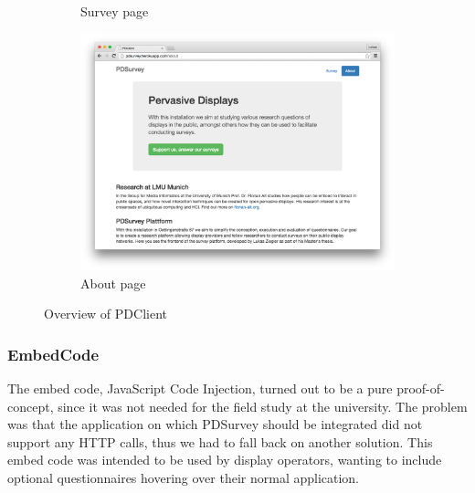 \begin{figure}
\begin{subfigure}[b]{0.6\textwidth}
		        \caption{Survey page}
		        \label{fig:4-pdclient-survey}
		    \end{subfigure}
		    \hfill
		    \begin{subfigure}[b]{0.6\textwidth}
		        \centering
		        \includegraphics[width=\textwidth]{img/screenshots/pdclient/about}
		        \caption{About page}
		        \label{fig:4-pdclient-about}
		    \end{subfigure}
		    \caption{Overview of PDClient}
		    \label{fig:pdclient-screenshots}
		\end{figure}



	\subsubsection{EmbedCode}

		The embed code, JavaScript Code Injection, turned out to be a pure proof-of-concept, since it was not needed for the field study at the university. The problem was that the application on which PDSurvey should be integrated did not support any HTTP calls, thus we had to fall back on another solution. This embed code was intended to be used by display operators, wanting to include optional questionnaires hovering over their normal application. 


